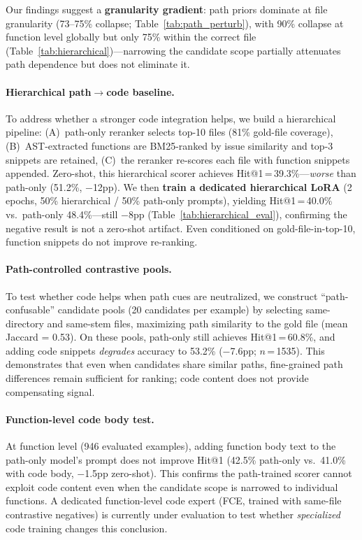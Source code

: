 \documentclass{article}
\begin{document}
Our findings suggest a \textbf{granularity gradient}: path priors dominate at file granularity (73--75\% collapse; Table~\ref{tab:path_perturb}), with 90\% collapse at function level globally but only 75\% within the correct file (Table~\ref{tab:hierarchical})---narrowing the candidate scope partially attenuates path dependence but does not eliminate it.

\paragraph{Hierarchical path$\to$code baseline.}
To address whether a stronger code integration helps, we build a hierarchical pipeline: (A)~path-only reranker selects top-10 files (81\% gold-file coverage), (B)~AST-extracted functions are BM25-ranked by issue similarity and top-3 snippets are retained, (C)~the reranker re-scores each file with function snippets appended.
Zero-shot, this hierarchical scorer achieves Hit@1\,=\,39.3\%---\emph{worse} than path-only (51.2\%, $-$12pp).
We then \textbf{train a dedicated hierarchical LoRA} (2 epochs, 50\% hierarchical / 50\% path-only prompts), yielding Hit@1\,=\,40.0\% vs.\ path-only 48.4\%---still $-$8pp (Table~\ref{tab:hierarchical_eval}), confirming the negative result is not a zero-shot artifact.
Even conditioned on gold-file-in-top-10, function snippets do not improve re-ranking.

\paragraph{Path-controlled contrastive pools.}
To test whether code helps when path cues are neutralized, we construct ``path-confusable'' candidate pools (20 candidates per example) by selecting same-directory and same-stem files, maximizing path similarity to the gold file (mean Jaccard = 0.53).
On these pools, path-only still achieves Hit@1\,=\,60.8\%, and adding code snippets \emph{degrades} accuracy to 53.2\% ($-$7.6pp; $n$\,=\,1535).
This demonstrates that even when candidates share similar paths, fine-grained path differences remain sufficient for ranking; code content does not provide compensating signal.

\paragraph{Function-level code body test.}
At function level (946 evaluated examples), adding function body text to the path-only model's prompt does not improve Hit@1 (42.5\% path-only vs.\ 41.0\% with code body, $-$1.5pp zero-shot).
This confirms the path-trained scorer cannot exploit code content even when the candidate scope is narrowed to individual functions.
A dedicated function-level code expert (FCE, trained with same-file contrastive negatives) is currently under evaluation to test whether \emph{specialized} code training changes this conclusion.
\end{document}
